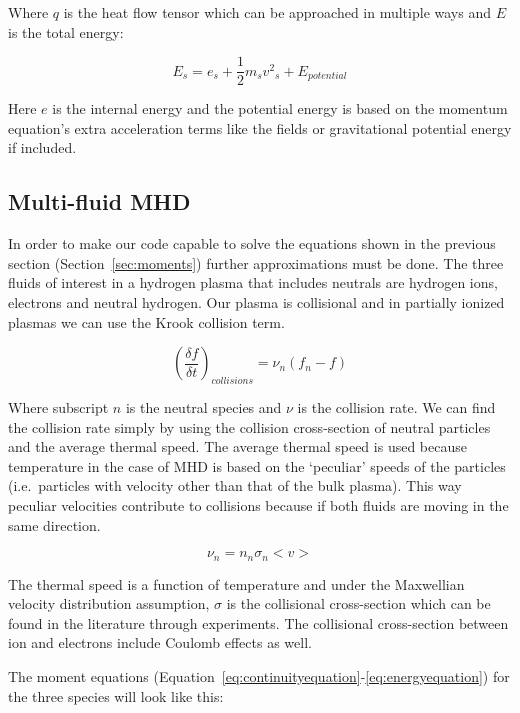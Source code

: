 \documentclass[12pt,upcase]{umlthesis}
\begin{document}
Where $q$ is the heat flow tensor which can be approached in multiple ways and $E$ is the total energy:

\begin{equation}\label{eq:energy}
	E_s = e_s + \frac{1}{2} m_s {v^2}_s + E_{potential}
\end{equation}

Here $e$ is the internal energy and the potential energy is based on the momentum equation's extra acceleration terms like the fields or gravitational potential energy if included.

\subsection{Multi-fluid MHD}\label{sec:multifluidmhd}

In order to make our code capable to solve the equations shown in the previous section (Section~\ref{sec:moments}) further approximations must be done. The three fluids of interest in a hydrogen plasma that includes neutrals are hydrogen ions, electrons and neutral hydrogen. Our plasma is collisional and in partially ionized plasmas we can use the Krook collision term.

\begin{equation}\label{eq:krook}
	{(\frac{\delta f}{\delta t})}_{collisions} = \nu_n (f_n - f)
\end{equation}

Where subscript $n$ is the neutral species and $\nu$ is the collision rate. We can find the collision rate simply by using the collision cross-section of neutral particles and the average thermal speed. The average thermal speed is used because temperature in the case of MHD is based on the `peculiar' speeds of the particles (i.e.\ particles with velocity other than that of the bulk plasma). This way peculiar velocities contribute to collisions because if both fluids are moving in the same direction.

\begin{equation}\label{eq:collisionrate}
	\nu_n = n_n \sigma_n <v>
\end{equation}

The thermal speed is a function of temperature and under the Maxwellian velocity distribution assumption, $\sigma$ is the collisional cross-section which can be found in the literature through experiments. The collisional cross-section between ion and electrons include Coulomb effects as well.

The moment equations (Equation~\ref{eq:continuityequation}-\ref{eq:energyequation}) for the three species will look like this:
\end{document}

